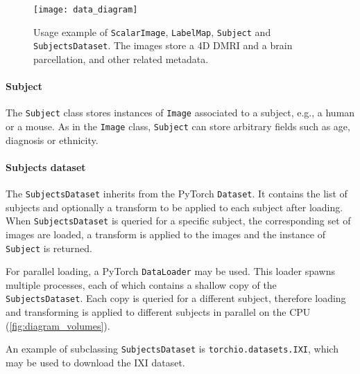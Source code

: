 \begin{figure}
    \centering
    \texttt{[image: data\_diagram]}
    \caption{%
        Usage example of \texttt{ScalarImage}, \texttt{LabelMap},
        \texttt{Subject} and \texttt{SubjectsDataset}.
        The images store a 4D \ac{DMRI} and a brain parcellation,
        and other related metadata.
    }
    \label{fig:data_structures}
\end{figure}


\paragraph{Subject}

The \texttt{Subject} class stores instances of \texttt{Image} associated to
a subject, e.g., a human or a mouse.
%
As in the \texttt{Image} class, \texttt{Subject} can store arbitrary fields
such as age, diagnosis or ethnicity.


\paragraph{Subjects dataset}

The \texttt{SubjectsDataset} inherits from the PyTorch \texttt{Dataset}.
%
It contains the list of subjects and optionally a transform
to be applied to each subject after loading.
%
When \texttt{SubjectsDataset} is queried for a specific subject,
the corresponding set of images are loaded,
a transform is applied to the images
and the instance of \texttt{Subject} is returned.


For parallel loading, a PyTorch \texttt{DataLoader} may be used.
%
This loader spawns multiple processes, each of which contains a
shallow copy of the \texttt{SubjectsDataset}.
%
Each copy is queried for a different subject, therefore loading and
transforming is applied to different subjects in parallel on the \ac{CPU} (\cref{fig:diagram_volumes}).


An example of subclassing \texttt{SubjectsDataset} is
\texttt{torchio.datasets.IXI}, which may be used to download
the \ac{IXI} dataset.


